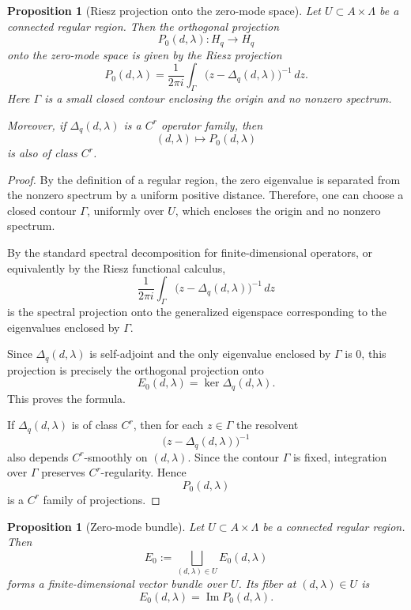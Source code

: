 \documentclass[10pt,a4paper]{amsart}
\newtheorem{proposition}[theorem]{Proposition}%
\begin{document}
\begin{proposition}[Riesz projection onto the zero-mode space]
Let \(U\subset A\times\Lambda\) be a connected regular region. Then the orthogonal
projection
\[
P_0(d,\lambda):H_q\to H_q
\]
onto the zero-mode space is given by the Riesz projection
\[
P_0(d,\lambda)
=
\frac{1}{2\pi i}
\int_\Gamma
\bigl(z-\Delta_q(d,\lambda)\bigr)^{-1}\,dz.
\]
Here \(\Gamma\) is a small closed contour enclosing the origin and no nonzero
spectrum.

Moreover, if \(\Delta_q(d,\lambda)\) is a \(C^r\) operator family, then
\[
(d,\lambda)\longmapsto P_0(d,\lambda)
\]
is also of class \(C^r\).
\end{proposition}

\begin{proof}
By the definition of a regular region, the zero eigenvalue is separated from the
nonzero spectrum by a uniform positive distance. Therefore, one can choose a
closed contour \(\Gamma\), uniformly over \(U\), which encloses the origin and no
nonzero spectrum.

By the standard spectral decomposition for finite-dimensional operators, or
equivalently by the Riesz functional calculus,
\[
\frac{1}{2\pi i}
\int_\Gamma
\bigl(z-\Delta_q(d,\lambda)\bigr)^{-1}\,dz
\]
is the spectral projection onto the generalized eigenspace corresponding to the
eigenvalues enclosed by \(\Gamma\).

Since \(\Delta_q(d,\lambda)\) is self-adjoint and the only eigenvalue enclosed by
\(\Gamma\) is \(0\), this projection is precisely the orthogonal projection onto
\[
E_0(d,\lambda)=\ker \Delta_q(d,\lambda).
\]
This proves the formula.

If \(\Delta_q(d,\lambda)\) is of class \(C^r\), then for each \(z\in\Gamma\) the
resolvent
\[
\bigl(z-\Delta_q(d,\lambda)\bigr)^{-1}
\]
also depends \(C^r\)-smoothly on \((d,\lambda)\). Since the contour \(\Gamma\) is
fixed, integration over \(\Gamma\) preserves \(C^r\)-regularity. Hence
\[
P_0(d,\lambda)
\]
is a \(C^r\) family of projections.
\end{proof}

\begin{proposition}[Zero-mode bundle]
Let \(U\subset A\times\Lambda\) be a connected regular region. Then
\[
E_0
:=
\bigsqcup_{(d,\lambda)\in U}E_0(d,\lambda)
\]
forms a finite-dimensional vector bundle over \(U\). Its fiber at
\((d,\lambda)\in U\) is
\[
E_0(d,\lambda)=\operatorname{Im}P_0(d,\lambda).
\]
\end{proposition}
\end{document}
